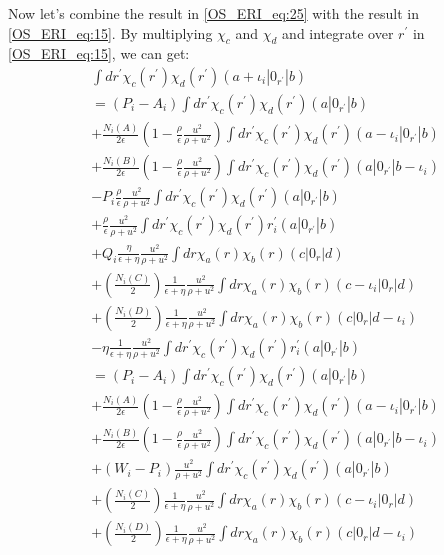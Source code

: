 Now let's combine the result in \ref{OS_ERI_eq:25} with the result in \ref{OS_ERI_eq:15}.
By multiplying $\chi_{c}$ and $\chi_{d}$ and integrate over $r^{'}$ in 
\ref{OS_ERI_eq:15}, we can get:
\begin{equation}
 \begin{split}
&\int dr^{'} \chi_{c}(r^{'})\chi_{d}(r^{'})(a+\iota_{i}|0_{r^{'}}|b) \\
&=(P_{i} - A_{i})\int dr^{'} \chi_{c}(r^{'})\chi_{d}(r^{'})(a|0_{r^{'}}|b) \\
&+
\frac{N_{i}(A)}{2\epsilon}\left(1-\frac{\rho}{\epsilon}
\frac{u^{2}}{\rho+u^{2}}\right)\int dr^{'} \chi_{c}(r^{'})\chi_{d}(r^{'})
(a-\iota_{i}|0_{r^{'}}|b) \\
&+ \frac{N_{i}(B)}{2\epsilon}\left(1-\frac{\rho}{\epsilon}
\frac{u^{2}}{\rho+u^{2}}\right)\int dr^{'} \chi_{c}(r^{'})\chi_{d}(r^{'})
(a|0_{r^{'}}|b-\iota_{i}) \\
&-P_{i}\frac{\rho}{\epsilon}
\frac{u^{2}}{\rho+u^{2}}\int dr^{'} \chi_{c}(r^{'})\chi_{d}(r^{'})(a|0_{r^{'}}|b) \\
&+\frac{\rho}{\epsilon}
\frac{u^{2}}{\rho+u^{2}}\int dr^{'} \chi_{c}(r^{'})\chi_{d}(r^{'})r^{'}_{i}(a|0_{r^{'}}|b) \\
&+Q_{i}\frac{\eta}{\epsilon+\eta}\frac{u^{2}}
{\rho+u^{2}}\int dr \chi_{a}(r)\chi_{b}(r)(c|0_{r}|d) \\
&+
\left(\frac{N_{i}(C)}{2}\right)\frac{1}{\epsilon+\eta}\frac{u^{2}}
{\rho+u^{2}}\int dr \chi_{a}(r)\chi_{b}(r)(c-\iota_{i}|0_{r}|d) \\
&+
\left(\frac{N_{i}(D)}{2}\right)\frac{1}{\epsilon+\eta}\frac{u^{2}}
{\rho+u^{2}}\int dr \chi_{a}(r)\chi_{b}(r)(c|0_{r}|d-\iota_{i}) \\
&-\eta \frac{1}{\epsilon+\eta}\frac{u^{2}}
{\rho+u^{2}}\int dr^{'} \chi_{c}(r^{'})\chi_{d}(r^{'}) r^{'}_{i}(a|0_{r^{'}}|b) \\
&= (P_{i} - A_{i})\int dr^{'} \chi_{c}(r^{'})\chi_{d}(r^{'})(a|0_{r^{'}}|b) \\
&+
\frac{N_{i}(A)}{2\epsilon}\left(1-\frac{\rho}{\epsilon}
\frac{u^{2}}{\rho+u^{2}}\right)\int dr^{'} \chi_{c}(r^{'})\chi_{d}(r^{'})
(a-\iota_{i}|0_{r^{'}}|b) \\
&+ \frac{N_{i}(B)}{2\epsilon}\left(1-\frac{\rho}{\epsilon}
\frac{u^{2}}{\rho+u^{2}}\right)\int dr^{'} \chi_{c}(r^{'})\chi_{d}(r^{'})
(a|0_{r^{'}}|b-\iota_{i}) \\
&+\left(W_{i} -P_{i}\right)
\frac{u^{2}}{\rho+u^{2}}\int dr^{'} \chi_{c}(r^{'})\chi_{d}(r^{'})(a|0_{r^{'}}|b) \\
&+
\left(\frac{N_{i}(C)}{2}\right)\frac{1}{\epsilon+\eta}\frac{u^{2}}
{\rho+u^{2}}\int dr \chi_{a}(r)\chi_{b}(r)(c-\iota_{i}|0_{r}|d) \\
&+
\left(\frac{N_{i}(D)}{2}\right)\frac{1}{\epsilon+\eta}\frac{u^{2}}
{\rho+u^{2}}\int dr \chi_{a}(r)\chi_{b}(r)(c|0_{r}|d-\iota_{i}) 
 \end{split}
\label{OS_ERI_eq:26}
\end{equation}
